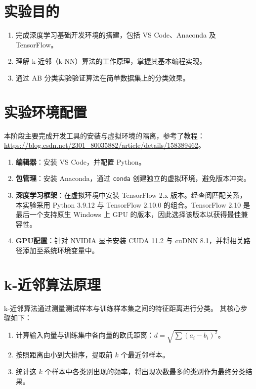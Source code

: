 \documentclass[10.5pt]{config}
\date{\today}
\begin{document}
\makeheader %

\section{实验目的}
\begin{enumerate}
    \item 完成深度学习基础开发环境的搭建，包括 VS Code、Anaconda 及 TensorFlow。
    \item 理解 k-近邻（k-NN）算法的工作原理，掌握其基本编程实现。
    \item 通过 AB 分类实验验证算法在简单数据集上的分类效果。
\end{enumerate}

\section{实验环境配置}
本阶段主要完成开发工具的安装与虚拟环境的隔离，参考了教程：\url{https://blog.csdn.net/2301_80035882/article/details/158389462}。

\begin{enumerate}
    \item \textbf{编辑器}：安装 VS Code，并配置 Python。
    \item \textbf{包管理}：安装 Anaconda，通过 \texttt{conda} 创建独立的虚拟环境，避免版本冲突。
    \item \textbf{深度学习框架}：在虚拟环境中安装 TensorFlow 2.x 版本。经查阅匹配关系，本实验采用 Python 3.9.12 与 TensorFlow 2.10.0 的组合。TensorFlow 2.10 是最后一个支持原生 Windows 上 GPU 的版本，因此选择该版本以获得最佳兼容性。
    \item \textbf{GPU配置}：针对 NVIDIA 显卡安装 CUDA 11.2 与 cuDNN 8.1，并将相关路径添加至系统环境变量中。
\end{enumerate}

\section{k-近邻算法原理}
k-近邻算法通过测量测试样本与训练样本集之间的特征距离进行分类。
其核心步骤如下：
\begin{enumerate}
    \item 计算输入向量与训练集中各向量的欧氏距离：$d = \sqrt{\sum (a_i - b_i)^2}$。
    \item 按照距离由小到大排序，提取前 $k$ 个最近邻样本。
    \item 统计这 $k$ 个样本中各类别出现的频率，将出现次数最多的类别作为最终分类结果。
\end{enumerate}
\end{document}
